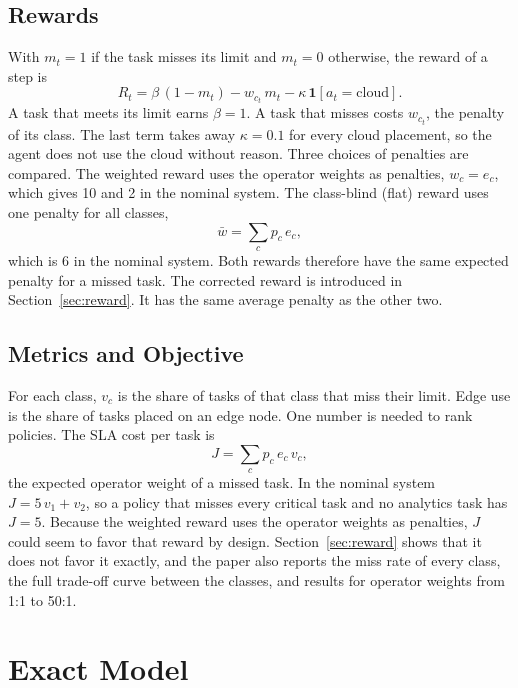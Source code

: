\documentclass[journal]{IEEEtran}
\begin{document}
\subsection{Rewards}
With $m_t = 1$ if the task misses its limit and $m_t = 0$ otherwise, the reward of a step is
\begin{equation}
R_t = \beta\,(1-m_t) - w_{c_t}\, m_t - \kappa\,\mathbf{1}[a_t = \text{cloud}].
\label{eq:reward}
\end{equation}
A task that meets its limit earns $\beta = 1$. A task that misses costs $w_{c_t}$, the penalty of its class. The last term takes away $\kappa=0.1$ for every cloud placement, so the agent does not use the cloud without reason. Three choices of penalties are compared. The weighted reward uses the operator weights as penalties, $w_c = e_c$, which gives 10 and 2 in the nominal system. The class-blind (flat) reward uses one penalty for all classes,
\begin{equation}
\bar w = \sum_c p_c\, e_c ,
\label{eq:flat}
\end{equation}
which is 6 in the nominal system. Both rewards therefore have the same expected penalty for a missed task. The corrected reward is introduced in Section~\ref{sec:reward}. It has the same average penalty as the other two.

\subsection{Metrics and Objective}
For each class, $v_c$ is the share of tasks of that class that miss their limit. Edge use is the share of tasks placed on an edge node. One number is needed to rank policies. The SLA cost per task is
\begin{equation}
J = \sum_c p_c\, e_c\, v_c ,
\label{eq:cost}
\end{equation}
the expected operator weight of a missed task. In the nominal system $J = 5\,v_1 + v_2$, so a policy that misses every critical task and no analytics task has $J=5$. Because the weighted reward uses the operator weights as penalties, $J$ could seem to favor that reward by design. Section~\ref{sec:reward} shows that it does not favor it exactly, and the paper also reports the miss rate of every class, the full trade-off curve between the classes, and results for operator weights from 1:1 to 50:1.

\section{Exact Model}
\label{sec:exact}
\end{document}
